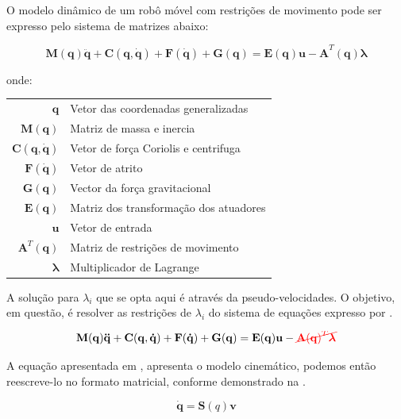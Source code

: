 O modelo dinâmico de um robô móvel com restrições de movimento pode ser expresso pelo sistema de matrizes abaixo:

\begin{equation}
    \mathbf{M(q)\ddot{q}+ C(q, \dot{q})+ F(\dot{q})+G(q) = E(q)u -A}^T\mathbf{(q)}\boldsymbol{\lambda}
\end{equation}

\noindent onde:

\begin{tabular}{ r | l }
    $\mathbf{q}$               & Vetor das coordenadas generalizadas   \\
    $\mathbf{M(q)}$            & Matriz de massa e inercia             \\
    $\mathbf{C(q, \dot{q})}$   & Vetor de força Coriolis e centrifuga  \\
    $\mathbf{F(\dot{q})}$      & Vetor de atrito                       \\
    $\mathbf{G(q)}$            & Vector da força gravitacional         \\
    $\mathbf{E(q)}$            & Matriz dos transformação dos atuadores \\
    $\mathbf{u}$               & Vetor de entrada                      \\
    $\mathbf{A}^T\mathbf{(q)}$ & Matriz de restrições de movimento     \\
    $\boldsymbol{\lambda}$     & Multiplicador de Lagrange             \\
\end{tabular}


A solução para $\lambda_i$ que se opta aqui é através da pseudo-velocidades. O objetivo, em questão, é resolver as restrições de $\lambda_i$ do 
sistema de equações expresso por .

\begin{equation}
    \mathbf{M(q)\ddot{q}+ C(q, \dot{q})+ F(\dot{q})+G(q) = E(q)u} - \textcolor{red}{\cancel{\mathbf{A}\mathbf{(q)}^T\boldsymbol{\lambda}}}
    \label{eq:rmrestri}
\end{equation}

A equação apresentada em , apresenta o modelo cinemático, podemos então reescreve-lo no formato matricial, conforme demonstrado na .

\begin{equation}
    \mathbf{\dot{q}} = \mathbf{S}(q)\mathbf{v}
    \label{eq:modcinematicomat}
\end{equation}


